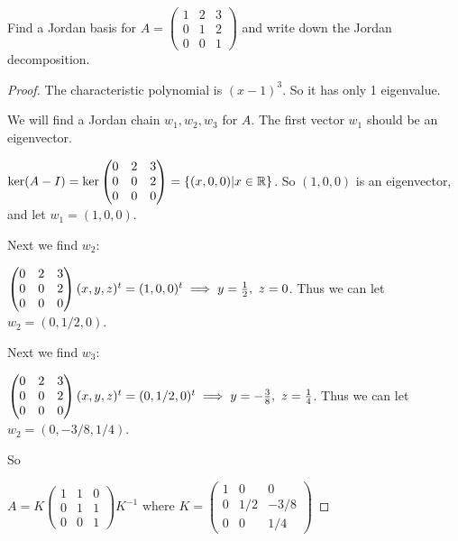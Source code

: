 \documentclass{amsart}
\begin{document}
	
\vspace{2em}

Find a Jordan basis for $A=\begin{pmatrix}
	1&2&3\\0&1&2\\0&0&1
\end{pmatrix}$ and write down the Jordan decomposition.

\begin{proof}
	The characteristic polynomial is $(x-1)^3$. So it has only 1 eigenvalue.
	
	We will find a Jordan chain $w_1,w_2,w_3$ for $A$. The first vector $w_1$ should be an eigenvector.
	
	$\ker(A-I)=\ker \begin{pmatrix}
	0&2&3\\0&0&2\\0&0&0
\end{pmatrix}=\{(x,0,0)|x\in \mathbb{R}\}$. So $(1,0,0)$ is an eigenvector, and let $w_1=(1,0,0)$.

Next we find $w_2$:

$\begin{pmatrix}
	0&2&3\\0&0&2\\0&0&0
\end{pmatrix}(x,y,z)^t= (1,0,0)^t\implies y={1\over 2},\  z=0$. Thus we can let $w_2=(0,1/2,0)$.

Next we find $w_3$:

$\begin{pmatrix}
	0&2&3\\0&0&2\\0&0&0
\end{pmatrix}(x,y,z)^t= (0,1/2,0)^t\implies y=-{3\over 8},\  z={1\over 4}$. Thus we can let $w_2=(0,-3/8,1/4)$.

So

$A=K\begin{pmatrix}
	1&1&0\\0&1&1\\0&0&1
\end{pmatrix}K^{-1}$
where $K=\begin{pmatrix}
	1&0&0\\0&1/2&-3/8\\0&0&1/4
\end{pmatrix}$

\end{proof}
\end{document}
